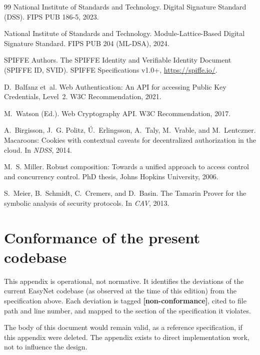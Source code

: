 \documentclass[11pt,a4paper]{article}
\newcommand{\defect}{\textcolor{defectcolor}{\textbf{[non-conformance]}}\xspace}
\begin{document}
\begin{thebibliography}{99}
National Institute of Standards and Technology.
\newblock Digital Signature Standard (DSS).
\newblock FIPS PUB 186-5, 2023.

National Institute of Standards and Technology.
\newblock Module-Lattice-Based Digital Signature Standard.
\newblock FIPS PUB 204 (ML-DSA), 2024.

SPIFFE Authors.
\newblock The SPIFFE Identity and Verifiable Identity Document (SPIFFE
ID, SVID).
\newblock SPIFFE Specifications v1.0+, \url{https://spiffe.io/}.

D.~Balfanz et~al.
\newblock Web Authentication: An API for accessing Public Key
Credentials, Level~2.
\newblock W3C Recommendation, 2021.

M.~Watson (Ed.).
\newblock Web Cryptography API.
\newblock W3C Recommendation, 2017.

A.~Birgisson, J.~G. Politz, {\'U}.~Erlingsson, A.~Taly, M.~Vrable, and
M.~Lentczner.
\newblock Macaroons: Cookies with contextual caveats for decentralized
authorization in the cloud.
\newblock In \emph{NDSS}, 2014.

M.~S. Miller.
\newblock Robust composition: Towards a unified approach to access
control and concurrency control.
\newblock PhD thesis, Johns Hopkins University, 2006.

S.~Meier, B.~Schmidt, C.~Cremers, and D.~Basin.
\newblock The Tamarin Prover for the symbolic analysis of security
protocols.
\newblock In \emph{CAV}, 2013.

\end{thebibliography}

\appendix
\section{Conformance of the present codebase}
\label{app:conformance}

This appendix is operational, not normative. It identifies the
deviations of the current EasyNet codebase (as observed at the time
of this edition) from the specification above. Each deviation is
tagged \defect, cited to file path and line number, and mapped to the
section of the specification it violates.

\begin{notebox}
The body of this document would remain valid, as a reference
specification, if this appendix were deleted. The appendix exists to
direct implementation work, not to influence the design.
\end{notebox}
\end{document}
